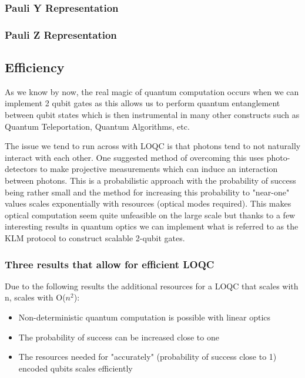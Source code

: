 \subsubsection{Pauli Y Representation}
\subsubsection{Pauli Z Representation}


\subsection{Efficiency}
As we know by now, the real magic of quantum computation occurs when we can implement 2 qubit gates as this allows us to perform quantum entanglement between qubit states which is then instrumental in many other constructs such as Quantum Teleportation, Quantum Algorithms, etc.

The issue we tend to run across with LOQC is that photons tend to not naturally interact with each other. One suggested method of overcoming this uses photo-detectors to make projective measurements which can induce an interaction between photons\cite{Kok:2005jip}. This is a probabilistic approach with the probability of success being rather small and the method for increasing this probability to "near-one" values scales exponentially with resources (optical modes required). This makes optical computation seem quite unfeasible on the large scale but thanks to a few interesting results in quantum optics we can implement what is referred to as the KLM protocol to construct scalable 2-qubit gates.


\subsubsection{Three results that allow for efficient LOQC}
Due to the following results the additional resources for a LOQC that scales with n, scales with O($n^2$):
\begin{itemize}
    \item Non-deterministic quantum computation is possible with linear optics
    \item The probability of success can be increased close to one
    \item The resources needed for "accurately" (probability of success close to 1) encoded qubits scales efficiently  
\end{itemize}


